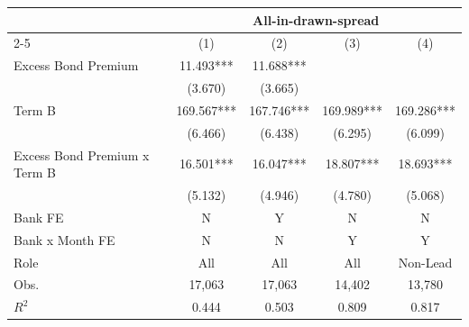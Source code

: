 {
\def\sym#1{\ifmmode^{#1}\else\(^{#1}\)\fi}
\begin{tabular}{l*{4}{c}}
\toprule\toprule
                                        &\multicolumn{4}{c}{All-in-drawn-spread}                        \\\cmidrule(lr){2-5}
                                        &\multicolumn{1}{c}{(1)}   &\multicolumn{1}{c}{(2)}   &\multicolumn{1}{c}{(3)}   &\multicolumn{1}{c}{(4)}   \\
\toprule
Excess Bond Premium                     &      11.493***&      11.688***&               &               \\
                                        &     (3.670)   &     (3.665)   &               &               \\
[1em]
Term B                                  &     169.567***&     167.746***&     169.989***&     169.286***\\
                                        &     (6.466)   &     (6.438)   &     (6.295)   &     (6.099)   \\
[1em]
Excess Bond Premium x Term B            &      16.501***&      16.047***&      18.807***&      18.693***\\
                                        &     (5.132)   &     (4.946)   &     (4.780)   &     (5.068)   \\
\toprule
Bank FE                                 &           N   &           Y   &           N   &           N   \\
Bank x Month FE                         &           N   &           N   &           Y   &           Y   \\
Role                                    &         All   &         All   &         All   &    Non-Lead   \\
Obs.                                    &      17,063   &      17,063   &      14,402   &      13,780   \\
$R^2$                                   &       0.444   &       0.503   &       0.809   &       0.817   \\
\toprule\toprule
\end{tabular}
}
